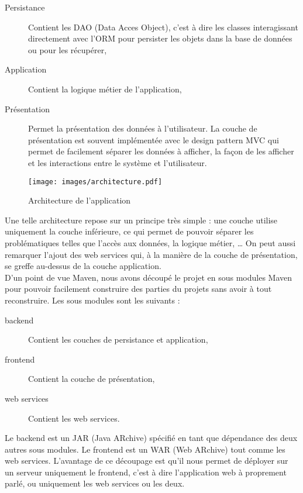 \begin{description}
	\item[Persistance] Contient les DAO (Data Acces Object), c'est à dire les classes interagissant directement avec l'ORM pour persister les objets dans la base de données ou pour les récupérer,
	
	\item[Application] Contient la logique métier de l'application,
	
	\item[Présentation] Permet la présentation des données à l'utilisateur. La couche de présentation est souvent implémentée avec le design pattern MVC qui permet de facilement séparer les données à afficher, la façon de les afficher et les interactions entre le système et l'utilisateur.
\end{description}

\begin{figure}[H]
	\centering
	\texttt{[image: images/architecture.pdf]}
	\caption{Architecture de l'application}
\end{figure}

Une telle architecture repose sur un principe très simple : une couche utilise uniquement la couche inférieure, ce qui permet de pouvoir séparer les problématiques telles que l'accès aux données, la logique métier, \dots{} On peut aussi remarquer l'ajout des web services qui, à la manière de la couche de présentation, se greffe au-dessus de la couche application.\\

D'un point de vue Maven, nous avons découpé le projet en sous modules Maven pour pouvoir facilement construire des parties du projets sans avoir à tout reconstruire. Les sous modules sont les suivants :

\begin{description}
	\item[backend] Contient les couches de persistance et application,
	\item[frontend] Contient la couche de présentation,
	\item[web services] Contient les web services.\\
\end{description}

Le backend est un JAR (Java ARchive) spécifié en tant que dépendance des deux autres sous modules. Le frontend est un WAR (Web ARchive) tout comme les web services. L'avantage de ce découpage est qu'il nous permet de déployer sur un serveur uniquement le frontend, c'est à dire l'application web à proprement parlé, ou uniquement les web services ou les deux.

